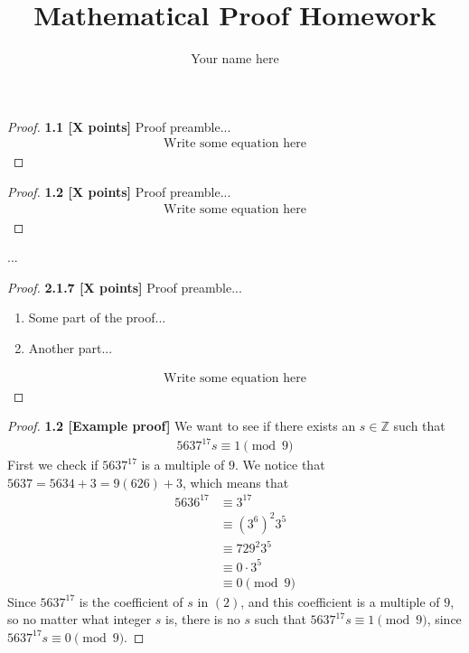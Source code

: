 \documentclass{article}[12pt]
\title{Mathematical Proof Homework}
\author{Your name here}
\begin{document}
\maketitle

\begin{proof}
    \textbf{1.1 [X points]}
    Proof preamble...
    \begin{align}
      \text{Write some equation here}
    \end{align}
\end{proof}


\begin{proof}
    \textbf{1.2 [X points]}
    Proof preamble...
    \begin{align}
      \text{Write some equation here}
    \end{align}
\end{proof}



...



\begin{proof}
    \textbf{2.1.7 [X points]}
    Proof preamble...
    \begin{enumerate}
        \item Some part of the proof...
        \item Another part...
    \end{enumerate}
    \begin{align}
      \text{Write some equation here}
    \end{align}
\end{proof}

\noindent\hrulefill

\begin{proof}
    \textbf{1.2 [Example proof]}
    We want to see if there exists an $s \in \mathbb{Z}$ such that 
    \begin{align}
       5637^{17}s \equiv 1 \pmod{9} 
    \end{align}
    First we check if $5637^{17}$ is a multiple of $9$. We notice that $5637 = 5634 + 3 = 9(626) + 3$, which means that
    \begin{align*}
       5636^{17} & \equiv 3^{17}\\
                 &\equiv (3^{6})^{2}3^{5}\\
                 &\equiv 729^{2}3^{5}\\
                 &\equiv 0\cdot3^{5}\\
                 &\equiv 0 \pmod{9}
    \end{align*}
    Since $5637^{17}$ is the coefficient of $s$ in $(2)$, and this coefficient is a multiple of $9$, so no matter what integer $s$ is, there is no $s$ such that $5637^{17}s \equiv 1 \pmod{9}$, since $5637^{17}s \equiv 0 \pmod{9}$. 
\end{proof}

\noindent\hrulefill
\end{document}
